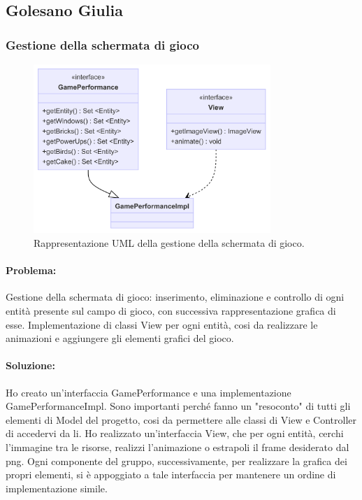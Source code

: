 \documentclass[a4paper,12pt]{report}
\begin{document}
\subsection{Golesano Giulia}

\subsubsection{Gestione della schermata di gioco}

\begin{figure}[H]
\centering{}
\includegraphics[width=0.8\textwidth]{img/game.png}
\caption{Rappresentazione UML della gestione della schermata di gioco.}
\end{figure}

\paragraph{Problema:}
Gestione della schermata di gioco: inserimento, eliminazione e controllo di ogni entità presente sul campo di gioco, con successiva rappresentazione grafica di esse.
Implementazione di classi View per ogni entità, cosi da realizzare le animazioni e aggiungere gli elementi grafici del gioco.

\paragraph{Soluzione:}
Ho creato un'interfaccia GamePerformance e una implementazione GamePerformanceImpl.
Sono importanti perché fanno un "resoconto" di tutti gli elementi di Model del progetto, cosi da permettere alle classi di View e Controller di accedervi da li.
Ho realizzato un'interfaccia View, che per ogni entità, cerchi l'immagine tra le risorse, realizzi l'animazione o estrapoli il frame desiderato dal png.
Ogni componente del gruppo, successivamente, per realizzare la grafica dei propri elementi, si è appoggiato a tale interfaccia per mantenere un ordine di implementazione simile.
\end{document}
